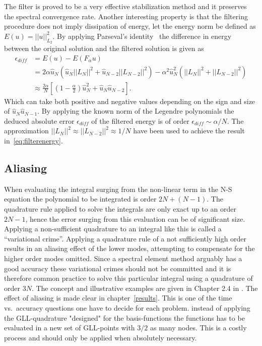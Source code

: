 The filter is proved to be a very effective stabilization method and it preserves the 
spectral convergence rate. Another interesting property is that the filtering procedure 
does not imply dissipation of energy, let the energy norm be defined as $E(u) = ||u||_{L_2}^2$.  
By applying Parseval's identity~\cite{Young} the difference in energy between the original solution
and the filtered solution is given as 
\begin{align}
   \epsilon_{diff}&=E(u) - E(F_{\alpha}u) \\
                &= 2\alpha\hat{u}_N(\hat{u}_N||L_N||^2+\hat{u}_{N-2}||L_{N-2}||^2)
    - \alpha^2\hat{u}^2_N(||L_N||^2+||L_{N-2}||^2)\\
    &\approx \frac{2\alpha}{N}\left[  (1-\frac{\alpha}{2})\hat{u}_N^2 + 
    \hat{u}_N\hat{u}_{N-2}\right].
    \label{eq:filterenergy}
\end{align}
Which can take both positive and negative values depending on the sign and size of
$\hat{u}_N\hat{u}_{N-1}$. By applying the known norm of the Legendre polynomials 
the deduced absolute error $\epsilon_{diff}$ of the filtered energy is of order 
$\epsilon_{diff}\sim \alpha/N$. The approximation $||L_N||^2\approx||L_{N-2}||^2\approx 1/N$
have been used to achieve the result in~\ref{eq:filterenergy}.


\subsection{Aliasing}

When evaluating the integral surging from the non-linear term in the N-S equation 
the polynomial to be integrated is order $2N+(N-1)$. The quadrature rule applied to solve the 
integrals are only exact up to an order $2N-1$, hence the error surging from this evaluation 
can be of significant size. Applying a non-sufficient quadrature to an integral like this is called a ``variational
crime''. Applying a quadrature rule of a not sufficiently high order results in an 
aliasing effect of the lower modes, attempting to compensate for the higher order modes omitted. 
Since a spectral element method arguably has a good accuracy these variational crimes should 
not be committed and it is therefore common practice to solve this particular integral using a
quadrature of order $3N$. The concept and illustrative examples are given in Chapter 2.4 in 
\cite{Karniadakis}. The effect of aliasing is made clear in chapter~\ref{results}.
This is one of the time vs.\ accuracy questions one have to decide for each problem. 
instead of applying the GLL-quadrature "designed" for the basis-functions the functions
has to be evaluated in a new set of GLL-points with $3/2$ as many nodes. This is a costly 
process and should only be applied when absolutely necessary. 

